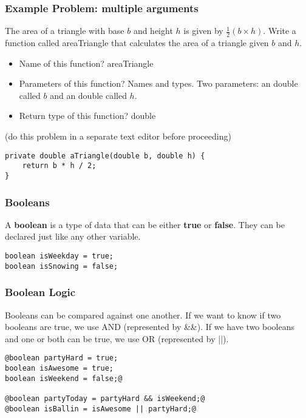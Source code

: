 \documentclass{beamer}
\begin{document}
\begin{frame}[fragile]
\frametitle{Example Problem: multiple arguments}
The area of a triangle with base $b$ and height $h$ is given by $\frac{1}{2}\left(b\times{h}\right)$. Write a function called areaTriangle that calculates the area of a triangle given $b$ and $h$.
\pause
\begin{itemize}
\item Name of this function? \pause areaTriangle
\pause
\item Parameters of this function? Names and types. \pause \newline Two parameters: an double called $b$ and an double called $h$.
\pause
\item Return type of this function? \pause \newline double
\end{itemize}
\pause
(do this problem in a separate text editor before proceeding)
\pause
\begin{lstlisting}
private double aTriangle(double b, double h) {
    return b * h / 2;
}
\end{lstlisting}
\end{frame}


\begin{frame}[fragile]
\frametitle{Booleans}
A \textbf{boolean} is a type of data that can be either \textbf{true} or \textbf{false}. They can be declared just like any other variable.

\begin{lstlisting}
boolean isWeekday = true;
boolean isSnowing = false;
\end{lstlisting}
\end{frame}

\begin{frame}[fragile]
\frametitle{Boolean Logic}
Booleans can be compared against one another. If we want to know if two booleans are true, we use AND (represented by \&\&). If we have two booleans and one or both can be true, we use OR (represented by ||).

\begin{lstlisting}[style=base]
@boolean partyHard = true;
boolean isAwesome = true;
boolean isWeekend = false;@

@boolean partyToday = partyHard && isWeekend;@
@boolean isBallin = isAwesome || partyHard;@
\end{lstlisting}
\end{frame}
\end{document}
